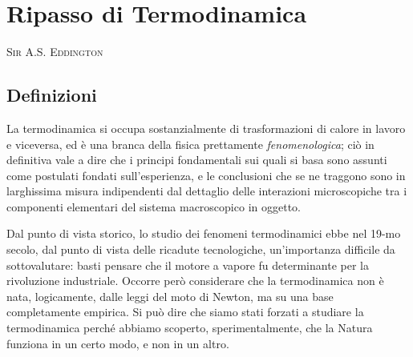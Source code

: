 \chapter{Ripasso di Termodinamica}
\label{cap:termodinamica}

\begin{minipage}{0.35\textwidth}\end{minipage}\hfill
\begin{minipage}{0.65\textwidth}
\vskip 0.25cm
\textsc{Sir A.S. Eddington}
\end{minipage}

\section{Definizioni}
\label{sec:01-def}

La termodinamica si occupa sostanzialmente di trasformazioni di calore in lavoro e viceversa, ed è una branca della fisica prettamente {\em fenomenologica}; ciò in definitiva vale a dire che i principi fondamentali sui quali si basa sono assunti come postulati fondati sull'esperienza, e le conclusioni che se ne traggono sono in larghissima misura indipendenti dal dettaglio delle interazioni microscopiche tra i componenti elementari del sistema macroscopico in oggetto.

Dal punto di vista storico, lo studio dei fenomeni termodinamici ebbe nel 19-mo secolo, dal punto di vista delle ricadute tecnologiche, un'importanza difficile da sottovalutare: basti pensare che il motore a vapore fu determinante per la rivoluzione industriale. Occorre però considerare che la termodinamica non è nata, logicamente, dalle leggi del moto di Newton, ma su una base completamente empirica. Si può dire che siamo stati forzati a studiare la termodinamica perché abbiamo scoperto, sperimentalmente, che la Natura funziona in un certo modo, e non in un altro.

